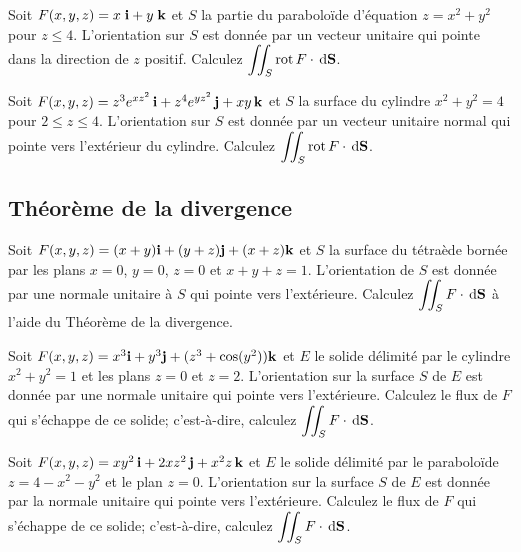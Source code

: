 \begin{question}
Soit $F(x,y,z) = x\; \mathbf{i} + y\;\mathbf{k}$ et $S$ la partie du
paraboloïde d'équation $z = x^2+y^2$ pour $z \leq 4$.  L'orientation
sur $S$ est donnée par un vecteur unitaire qui pointe dans la
direction de $z$ positif.  Calculez
$\displaystyle \iint_S \operatorname{rot} F \cdot \,\mathrm{d}\mathbf{S}$.
\label{17Q28}
\end{question}

\begin{question}
Soit $F(x,y,z) = z^3 e^{xz^2}\, \mathbf{i} + z^4 e^{yz^2}\, \mathbf{j} + xy\,\mathbf{k}$ et
$S$ la surface du cylindre $x^2+y^2 = 4$ pour $2 \leq z \leq 4$.
L'orientation sur $S$ est donnée par un vecteur unitaire normal qui
pointe vers l'extérieur du cylindre.  Calculez
$\displaystyle \iint_S \operatorname{rot}  F \cdot \,\mathrm{d}\mathbf{S}$.
\label{17Q29}
\end{question}

\subsection{Théorème de la divergence}

\begin{question}
Soit $F(x,y,z) = (x+y)\mathbf{i} + (y+z) \mathbf{j} + (x + z) \mathbf{k}$ et
$S$ la surface du tétraède bornée par les plans $x=0$, $y=0$, $z=0$ et
$x+y+z=1$.  L'orientation de $S$ est donnée par une normale unitaire à
$S$ qui pointe vers l'extérieure.  Calculez
$\displaystyle \iint_S F \cdot \,\mathrm{d}\mathbf{S}$ à l'aide du
Théorème de la divergence.
\label{17Q30}
\end{question}

\begin{question}
Soit $F(x,y,z) = x^3\mathbf{i} + y^3 \mathbf{j} + (z^3 + \cos(y^2)) \mathbf{k}$ et
$E$ le solide délimité par le cylindre $x^2+y^2 =1$ et les plans $z=0$
et $z=2$.  L'orientation sur la surface $S$ de $E$ est donnée par une
normale unitaire qui pointe vers l'extérieure.  Calculez le flux de
$F$ qui s'échappe de ce solide; c'est-à-dire, calculez
$\displaystyle \iint_S F \cdot \,\mathrm{d}\mathbf{S}$.
\label{17Q31}
\end{question}

\begin{question}
Soit $F(x,y,z) = xy^2\,\mathbf{i} + 2xz^2\, \mathbf{j} + x^2 z\, \mathbf{k}$ et
$E$ le solide délimité par le paraboloïde $z = 4 - x^2 - y^2$ et le
plan $z=0$.  L'orientation sur la surface $S$ de $E$ est donnée par la
normale unitaire qui pointe vers l'extérieure.  Calculez le flux de
$F$ qui s'échappe de ce solide; c'est-à-dire, calculez
$\displaystyle \iint_S F \cdot \,\mathrm{d}\mathbf{S}$.
\label{17Q32}
\end{question}


